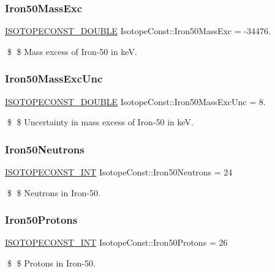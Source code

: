 \subsubsection{\texorpdfstring{Iron50\+Mass\+Exc}{Iron50MassExc}}
{\footnotesize\ttfamily \mbox{\hyperlink{group___isotope_const-_macros_ga8f45a7272ce02c0b4c65c44636ed719a}{I\+S\+O\+T\+O\+P\+E\+C\+O\+N\+S\+T\+\_\+\+D\+O\+U\+B\+LE}} Isotope\+Const\+::\+Iron50\+Mass\+Exc = -\/34476.}

\$ \$ Mass excess of Iron-\/50 in keV. \mbox{\label{group___isotope_const-_iron-_fe50_gaa83abbb0d8fee96076d5e0cb50f406cc}} 
\subsubsection{\texorpdfstring{Iron50\+Mass\+Exc\+Unc}{Iron50MassExcUnc}}
{\footnotesize\ttfamily \mbox{\hyperlink{group___isotope_const-_macros_ga8f45a7272ce02c0b4c65c44636ed719a}{I\+S\+O\+T\+O\+P\+E\+C\+O\+N\+S\+T\+\_\+\+D\+O\+U\+B\+LE}} Isotope\+Const\+::\+Iron50\+Mass\+Exc\+Unc = 8.}

\$ \$ Uncertainty in mass excess of Iron-\/50 in keV. \mbox{\label{group___isotope_const-_iron-_fe50_gae192357b0d379d7c1d366b275074e672}} 
\subsubsection{\texorpdfstring{Iron50\+Neutrons}{Iron50Neutrons}}
{\footnotesize\ttfamily \mbox{\hyperlink{group___isotope_const-_macros_ga5f18360b3e99483a35c32d789e62621c}{I\+S\+O\+T\+O\+P\+E\+C\+O\+N\+S\+T\+\_\+\+I\+NT}} Isotope\+Const\+::\+Iron50\+Neutrons = 24}

\$ \$ Neutrons in Iron-\/50. \mbox{\label{group___isotope_const-_iron-_fe50_ga7121ca5cbfccc5fcf3bd324c83e0bc69}} 
\subsubsection{\texorpdfstring{Iron50\+Protons}{Iron50Protons}}
{\footnotesize\ttfamily \mbox{\hyperlink{group___isotope_const-_macros_ga5f18360b3e99483a35c32d789e62621c}{I\+S\+O\+T\+O\+P\+E\+C\+O\+N\+S\+T\+\_\+\+I\+NT}} Isotope\+Const\+::\+Iron50\+Protons = 26}

\$ \$ Protons in Iron-\/50. 